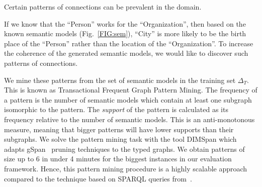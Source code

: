 \documentclass[letterpaper]{article} %
\newcommand{\authornote}[3]{
  {\fbox{\sc 
  #1}:$\blacktriangleright$\textcolor{#2}{\small{#3}}$\blacktriangleleft$}%
}
\newcommand{\ddg}[1]{\authornote{DDG}{blue}{#1}}
\newcommand{\npr}[1]{\authornote{NPR}{orange}{#1}}
\newcommand{\forijcai}[1]{}
\begin{document}
Certain patterns of connections can be prevalent in the domain.
\forijcai{
For example, in Fig.~\ref{FIG:sem} both semantic models have class nodes ``City'', ``Organization'' and ``Person''.
According to the ontology in Fig.~\ref{FIG:onto} there are multiple ways to connect these nodes.
}
If we know that the ``Person'' works for the ``Organization'', then based on the known semantic models (Fig.~\ref{FIG:sem}), ``City'' is more likely to be the birth place of the ``Person'' rather than the location of the ``Organization''.
To increase the coherence of the generated semantic models, we would like to discover such patterns of connections.


We mine these patterns from the set of semantic models in the training set $\Delta_T$.
This is known as Transactional Frequent Graph Pattern Mining\forijcai{, which
includes the subgraph isomorphism problem, known to be NP-complete}.
The frequency of a pattern is the number of semantic models 
which contain
at least one subgraph isomorphic to the pattern.
The \emph{support} of the pattern is calculated as its 
frequency relative to the number of semantic models.
This is an anti-monotonous measure, meaning that bigger 
patterns will have lower supports than their subgraphs.
We solve the pattern mining task with the tool DIMSpan \cite{petermann2017dimspan} which adapts gSpan~\cite{yan2002gspan} pruning techniques to the typed graphs.\forijcai{and uses Apache Flink for scalability.}  
We obtain patterns of size up to 6 in under 4 minutes for the biggest instances 
in our evaluation framework.
Hence, this pattern mining procedure is a highly 
scalable approach compared to the technique based on SPARQL queries 
from~\cite{Taheriyan:Leveraging}.
\end{document}
